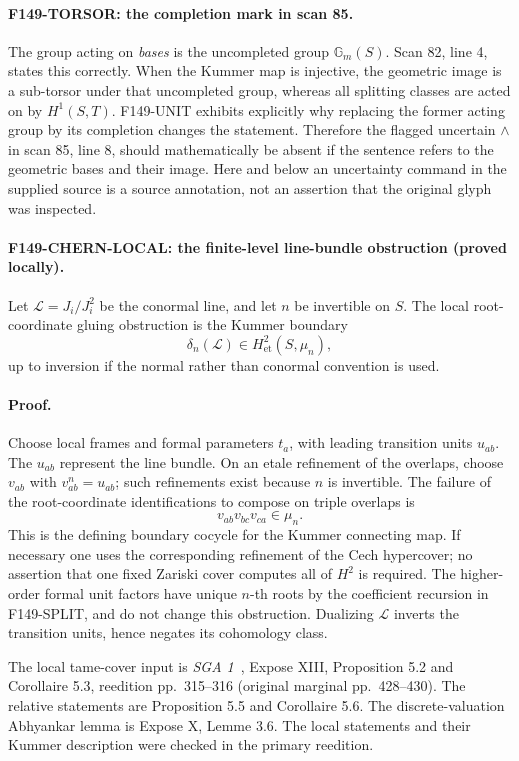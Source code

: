 \paragraph{F149-TORSOR: the completion mark in scan 85.}
The group acting on \emph{bases} is the uncompleted group
\(\mathbb G_m(S)\).  Scan 82, line 4, states this correctly.  When the
Kummer map is injective, the geometric image is a sub-torsor under
that uncompleted group, whereas all splitting classes are acted on by
\(H^1(S,T)\).  F149-UNIT exhibits explicitly why replacing the former
acting group by its completion changes the statement.  Therefore the
flagged uncertain \(\wedge\) in scan 85, line 8, should mathematically
be absent if the sentence refers to the geometric bases and their
image.  Here and below an uncertainty command in the supplied source
is a source annotation, not an assertion that the original glyph was
inspected.

\paragraph{F149-CHERN-LOCAL: the finite-level line-bundle obstruction
(proved locally).}
Let \(\mathcal L=J_i/J_i^2\) be the conormal line, and let \(n\) be
invertible on \(S\).  The local root-coordinate gluing obstruction is
the Kummer boundary
\[
 \delta_n(\mathcal L)\in H^2_{\mathrm{et}}(S,\mu_n),
\]
up to inversion if the normal rather than conormal convention is used.

\paragraph{Proof.}
Choose local frames and formal parameters \(t_a\), with leading
transition units \(u_{ab}\).  The \(u_{ab}\) represent the line bundle.
On an etale refinement of the overlaps, choose
\(v_{ab}\) with \(v_{ab}^n=u_{ab}\); such refinements exist because
\(n\) is invertible.  The failure of the root-coordinate identifications
to compose on triple overlaps is
\[
 v_{ab}v_{bc}v_{ca}\in\mu_n.
\]
This is the defining boundary cocycle for the Kummer connecting map.
If necessary one uses the corresponding refinement of the Cech
hypercover; no assertion that one fixed Zariski cover computes all of
\(H^2\) is required.  The higher-order formal unit factors have unique
\(n\)-th roots by the coefficient recursion in F149-SPLIT, and do not
change this obstruction.  Dualizing \(\mathcal L\) inverts the
transition units, hence negates its cohomology class.

The local tame-cover input is \emph{SGA 1}~\cite{SGA1}, Expose XIII,
Proposition 5.2 and Corollaire 5.3, reedition pp.~315--316
(original marginal pp.~428--430).  The relative statements are
Proposition 5.5 and Corollaire 5.6.  The discrete-valuation
Abhyankar lemma is Expose X, Lemme 3.6.  The local statements and
their Kummer description were checked in the primary reedition.

